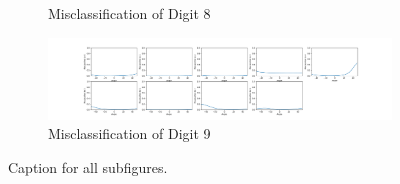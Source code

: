 \begin{figure}[htb!]
\begin{subfigure}[b]{\textwidth}
        \caption{Misclassification of Digit 8}
        \label{fig:Rotate-misclass0}
    \end{subfigure}
    \begin{subfigure}[b]{ \textwidth}
        \centering
        \includegraphics[width=\textwidth]{chapters/results/CNN/Rotate/acc10.png}
        \caption{Misclassification of Digit 9}
        \label{fig:Rotate-misclass1}
    \end{subfigure}
    \caption{Caption for all subfigures.}
    \label{fig:Rotate-misclassifications}
\end{figure}
        
\clearpage
